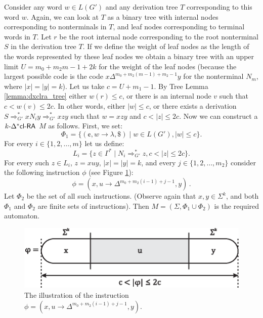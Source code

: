 Consider any word $w \in L(G')$ and any derivation tree $T$ corresponding to this word $w$. Again, we can look at $T$ as a binary tree with internal nodes corresponding to nonterminals in $T$, and leaf nodes corresponding to terminal words in $T$. Let $r$ be the root internal node corresponding to the root nonterminal $S$ in the derivation tree $T$. If we define the weight of leaf nodes as the length of the words represented by these leaf nodes we obtain a binary tree with an upper limit $U = m_0 + m_2 m - 1 + 2k$ for the weight of the leaf nodes (because the largest possible code is the code $x \Delta^{m_0 + m_2 (m - 1) + m_2 - 1} y$ for the nonterminal $N_m$, where $|x| = |y| = k$). Let us take $c = U + m_1 - 1$. By Tree Lemma \ref{lemma:dxclra_tree} either $w(r) \le c$, or there is an internal node $v$ such that $c < w(v) \le 2c$. In other words, either $|w| \le c$, or there exists a derivation $S \Rightarrow_{G'}^* x N_i y \Rightarrow_{G'}^* xzy$ such that $w = xzy$ and $c < |z| \le 2c$. Now we can construct a $\kDXclRA[k]$ $M$ as follows.
First, we set:
$$\Phi_1 = \{ (\cent, w \to \lambda, \$) \mid w \in L(G'), |w| \le c \}.$$
For every $i \in \{1, 2, \ldots, m\}$ let us define:
$$L_i = \{z \in \Gamma^* \mid N_i \Rightarrow_{G'}^* z, c < |z| \le 2c\}.$$
For every such $z \in L_i$, $z = x u y$, $|x| = |y| = k$, and every $j \in \{1, 2, \ldots, m_2\}$ consider the following instruction $\phi$ (see Figure \ref{figure:instruction_phi}):
$$\phi = (x, u \to \Delta^{m_0 + m_2 (i - 1) + j - 1}, y)\,.$$
Let $\Phi_2$ be the set of all such instructions. (Observe again that $x, y \in \Sigma^k$, and both $\Phi_1$ and $\Phi_2$ are finite sets of instructions). Then $M = (\Sigma, \Phi_1 \cup \Phi_2)$ is the required automaton.

\begin{figure}[htp]
\centering
\includegraphics[scale=1.0]{img/instruction_phi.eps}
\caption[The illustration of the instruction $\phi$.]
{The illustration of the instruction $\phi = (x, u \to \Delta^{m_0 + m_2 (i - 1) + j - 1}, y)$.}
\label{figure:instruction_phi}
\end{figure}

